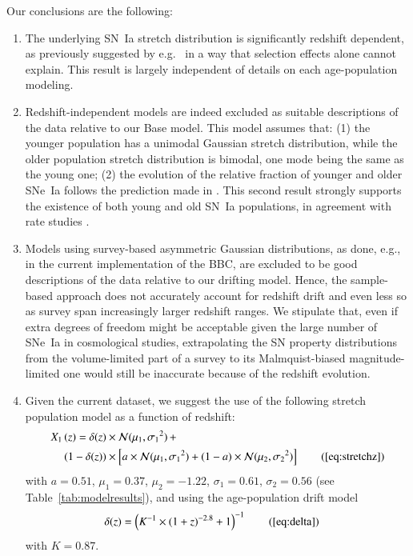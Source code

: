 \documentclass[]{aa}
\newcommand{\nn}[1]{\textcolor[rgb]{0.25, 0.50, 0}{#1}}
\begin{document}
Our conclusions are the following:
\begin{enumerate}
    \item The underlying SN~Ia stretch distribution is significantly redshift
        dependent, as previously suggested by e.g.~\cite{howell2007} \nn{in a
        way that selection effects alone cannot explain}. This result is largely
        independent of details on each age-population modeling.
    
    \item Redshift-independent models are indeed excluded as suitable
        descriptions of the data relative to our Base model. This model assumes
        that: (1) the younger population has a unimodal Gaussian stretch
        distribution, while the older population stretch distribution is
        bimodal, one mode being the same as the young one; (2) the evolution of
        the relative fraction of younger and older SNe~Ia follows the prediction
        made in \cite{rigault2018}. This second result strongly supports the
        existence of both young and old SN~Ia populations, in agreement with
        rate studies \cite{mannucci2005, scannapieco2005, sullivan2006,
        aubourg2008}. 
        
    \item Models using survey-based asymmetric Gaussian distributions, as done,
        e.g., in the current implementation of the BBC, are excluded to be good
        descriptions of the data relative to our drifting model. Hence, the
        sample-based approach does not accurately account for redshift drift and
        even less so as survey span increasingly larger redshift ranges. We
        stipulate that, even if extra degrees of freedom might be acceptable
        given the large number of SNe~Ia in cosmological studies, extrapolating
        the SN property distributions from the volume-limited part of a survey
        to its Malmquist-biased magnitude-limited one would still be inaccurate
        because of the redshift evolution.

    \item Given the current dataset, we suggest the use of the following stretch
        population model as a function of redshift:
        \begin{align*}
        \label{eqconclusion:stretchz}
            X_1\left(z \right) =
            \delta(z)&\times\mathcal{N}(\mu_1,\sigma_1{}^2)\,+\nonumber\\
            (1-\delta(z))&\times \left[a\times\mathcal{N}(\mu_1,\sigma_1{}^2) +
            (1-a)\times\mathcal{N}(\mu_2,\sigma_2{}^2)\right]
            \tag{\ref{eq:stretchz}}
        \end{align*}
        with $a=0.51$, $\mu_1=0.37$, $\mu_2=-1.22$, $\sigma_1=0.61$,
        $\sigma_2=0.56$ (see Table~\ref{tab:modelresults}), and using the
        age-population drift model \begin{align*}
            \delta(z) & = \left( K^{-1} \times (1+z)^{-2.8} +1 \right)^{-1}
            \tag{\ref{eq:delta}}
        \end{align*}
        with $K=0.87$.
\end{enumerate}
\end{document}
